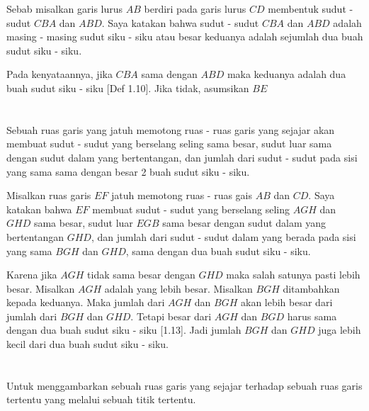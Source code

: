 \documentclass[a4paper, 12pt]{book}
\begin{document}
Sebab misalkan garis lurus $AB$ berdiri pada garis lurus $CD$ membentuk 
sudut - sudut $CBA$ dan $ABD$. Saya katakan bahwa sudut - sudut $CBA$ dan
$ABD$ adalah masing - masing sudut siku - siku atau besar keduanya adalah 
sejumlah dua buah sudut siku - siku.

Pada kenyataannya, jika $CBA$ sama dengan $ABD$ maka keduanya adalah dua buah 
sudut siku - siku [Def 1.10]. Jika tidak, asumsikan $BE$
\setcounter{section}{29}
\section*{\centering \thesection} 
Sebuah ruas garis yang jatuh memotong ruas - ruas garis yang sejajar akan membuat
sudut - sudut yang berselang seling sama besar, sudut luar sama dengan sudut dalam
yang bertentangan, dan jumlah dari sudut - sudut pada sisi yang sama sama dengan
besar 2 buah sudut siku - siku.  


Misalkan ruas garis $EF$ jatuh memotong ruas - ruas gais $AB$ dan $CD$. 
Saya katakan bahwa $EF$ membuat sudut - sudut yang berselang seling 
$AGH$ dan $GHD$ sama besar, sudut luar $EGB$ sama besar dengan sudut dalam
yang bertentangan $GHD$, dan jumlah dari sudut - sudut dalam yang berada 
pada sisi yang sama $BGH$ dan $GHD$, sama dengan dua buah sudut siku - siku.

Karena jika $AGH$ tidak sama besar dengan $GHD$ maka salah satunya pasti
lebih besar. Misalkan $AGH$ adalah yang lebih besar. Misalkan $BGH$ 
ditambahkan kepada keduanya. Maka jumlah dari $AGH$ dan $BGH$ akan 
lebih besar dari jumlah dari $BGH$ dan $GHD$. Tetapi besar dari $AGH$
dan $BGD$ harus sama dengan dua buah sudut siku - siku [1.13]. Jadi
jumlah $BGH$ dan $GHD$ juga lebih kecil dari dua buah sudut siku - siku.

\setcounter{section}{31}
\section*{\centering \thesection} 
Untuk menggambarkan sebuah ruas garis yang sejajar terhadap sebuah ruas 
garis tertentu yang melalui sebuah titik tertentu.
\end{document}
